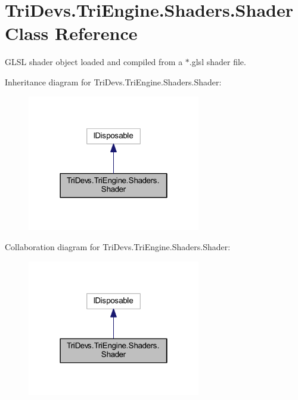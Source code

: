 \hypertarget{class_tri_devs_1_1_tri_engine_1_1_shaders_1_1_shader}{\section{Tri\-Devs.\-Tri\-Engine.\-Shaders.\-Shader Class Reference}
\label{class_tri_devs_1_1_tri_engine_1_1_shaders_1_1_shader}
}


G\-L\-S\-L shader object loaded and compiled from a $\ast$.glsl shader file.  




Inheritance diagram for Tri\-Devs.\-Tri\-Engine.\-Shaders.\-Shader\-:
\nopagebreak
\begin{figure}[H]
\begin{center}
\leavevmode
\includegraphics[width=214pt]{class_tri_devs_1_1_tri_engine_1_1_shaders_1_1_shader__inherit__graph}
\end{center}
\end{figure}


Collaboration diagram for Tri\-Devs.\-Tri\-Engine.\-Shaders.\-Shader\-:
\nopagebreak
\begin{figure}[H]
\begin{center}
\leavevmode
\includegraphics[width=214pt]{class_tri_devs_1_1_tri_engine_1_1_shaders_1_1_shader__coll__graph}
\end{center}
\end{figure}
